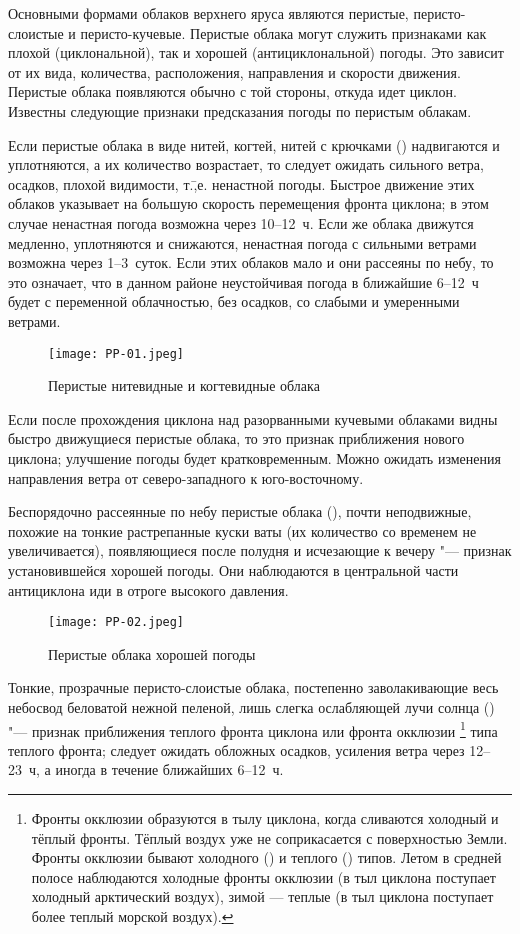 Основными формами облаков верхнего яруса являются перистые,
перисто-слоистые и перисто-кучевые. Перистые облака могут служить
признаками как плохой (циклональной), так и хорошей (антициклональной)
погоды. Это зависит от их вида, количества, расположения, направления
и скорости движения. Перистые облака появляются обычно с той стороны,
откуда идет циклон. Известны следующие признаки предсказания погоды по
перистым облакам.

 Если перистые облака в виде нитей, когтей, нитей с крючками
() надвигаются и уплотняются, а их количество возрастает,
то следует ожидать сильного ветра, осадков, плохой видимости,
т.\=,е. ненастной погоды. Быстрое движение этих облаков указывает на
большую скорость перемещения фронта циклона; в этом случае ненастная
погода возможна через 10--12~ч. Если же облака движутся медленно,
уплотняются и снижаются, ненастная погода с сильными ветрами возможна
через 1--3~суток. Если этих облаков мало и они рассеяны по небу,
то это означает, что в данном районе неустойчивая погода в ближайшие
6--12~ч будет с переменной облачностью, без осадков, со слабыми и
умеренными ветрами.

\begin{figure}[htb]
  \centering{}
  \texttt{[image: PP-01.jpeg]}
  \caption{Перистые нитевидные и когтевидные облака}
  \label{fig:pp01}
  \small
  \centering{}
\end{figure}

 Если после прохождения циклона над разорванными кучевыми
облаками видны быстро движущиеся перистые облака, то это признак
приближения нового циклона; улучшение погоды будет
кратковременным. Можно ожидать изменения направления ветра от
северо-западного к юго-восточному.

 Беспорядочно рассеянные по небу перистые облака (),
почти неподвижные, похожие на тонкие растрепанные куски ваты (их
количество со временем не увеличивается), появляющиеся после полудня и
исчезающие к вечеру "--- признак установившейся хорошей погоды. Они
наблюдаются в центральной части антициклона иди в отроге высокого
давления.

\begin{figure}[htb]
  \centering{}
  \texttt{[image: PP-02.jpeg]}
  \caption{Перистые облака хорошей погоды}
  \label{fig:pp02}
  \small
  \centering{}
\end{figure}

 Тонкие, прозрачные перисто-слоистые облака, постепенно
заволакивающие весь небосвод беловатой нежной пеленой, лишь слегка
ослабляющей лучи солнца () "--- признак приближения теплого
фронта циклона или фронта окклюзии \footnote{Фронты окклюзии
  образуются в тылу циклона, когда сливаются холодный и тёплый
  фронты. Тёплый воздух уже не соприкасается с поверхностью
  Земли. Фронты окклюзии бывают холодного () и теплого
  () типов. Летом в средней полосе наблюдаются холодные
  фронты окклюзии (в тыл циклона поступает холодный арктический
  воздух), зимой — теплые (в тыл циклона поступает более теплый
  морской воздух).} типа теплого фронта; следует ожидать обложных
осадков, усиления ветра через 12--23~ч, а иногда в течение ближайших
6--12~ч.

